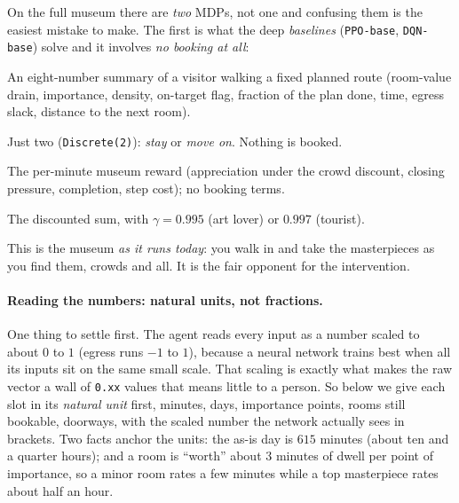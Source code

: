 \documentclass[11pt]{article}
\begin{document}
On the full museum there are \emph{two} MDPs, not one and confusing them is the easiest
mistake to make. The first is what the deep \emph{baselines} (\texttt{PPO-base},
\texttt{DQN-base}) solve and it involves \emph{no booking at all}:
\begin{description}[leftmargin=0pt,style=nextline,itemsep=2pt]
\item[State] An eight-number summary of a visitor walking a fixed planned route (room-value
drain, importance, density, on-target flag, fraction of the plan done, time, egress slack,
distance to the next room).
\item[Action] Just two (\texttt{Discrete(2)}): \emph{stay} or \emph{move on}. Nothing is booked.
\item[Reward] The per-minute museum reward (appreciation under the crowd discount, closing
pressure, completion, step cost); no booking terms.
\item[Return / Discount] The discounted sum, with $\gamma = 0.995$ (art lover) or $0.997$ (tourist).
\end{description}
This is the museum \emph{as it runs today}: you walk in and take the masterpieces as you find
them, crowds and all. It is the fair opponent for the intervention.

\paragraph{Reading the numbers: natural units, not fractions.} One thing to settle first. The agent
reads every input as a number scaled to about $0$ to $1$ (egress runs $-1$ to $1$), because a neural
network trains best when all its inputs sit on the same small scale. That scaling is exactly what makes
the raw vector a wall of \texttt{0.xx} values that means little to a person. So below we give each slot
in its \emph{natural unit} first, minutes, days, importance points, rooms still bookable, doorways, with
the scaled number the network actually sees in brackets. Two facts anchor the units: the as-is day is
$615$ minutes (about ten and a quarter hours); and a room is ``worth'' about $3$ minutes of dwell per
point of importance, so a minor room rates a few minutes while a top masterpiece rates about half an
hour.
\end{document}
